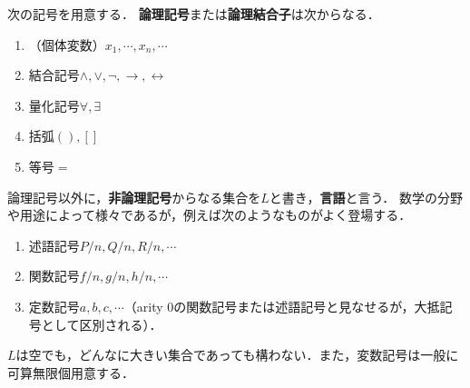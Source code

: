 \documentclass[uplatex, 12pt, dvipdfmx]{jsreport}
\begin{document}
\begin{definition}[language]
    次の記号を用意する．
    \textbf{論理記号}または\textbf{論理結合子}は次からなる．
    \begin{enumerate}
        \item （個体変数）$x_1,\cdots,x_n,\cdots$
        \item 結合記号$\land,\lor,\lnot,\to,\leftrightarrow$
        \item 量化記号$\forall,\exists$
        \item 括弧$(),[]$
        \item 等号$=$
    \end{enumerate}
    論理記号以外に，\textbf{非論理記号}からなる集合を$L$と書き，\textbf{言語}と言う．
    数学の分野や用途によって様々であるが，例えば次のようなものがよく登場する．
    \begin{enumerate}
        \item 述語記号$P/n,Q/n,R/n,\cdots$
        \item 関数記号$f/n,g/n,h/n,\cdots$
        \item 定数記号$a,b,c,\cdots$（arity 0の関数記号または述語記号と見なせるが，大抵記号として区別される）．
    \end{enumerate}
\end{definition}
\begin{remark}
    $L$は空でも，どんなに大きい集合であっても構わない．また，変数記号は一般に可算無限個用意する．
\end{remark}
\end{document}
